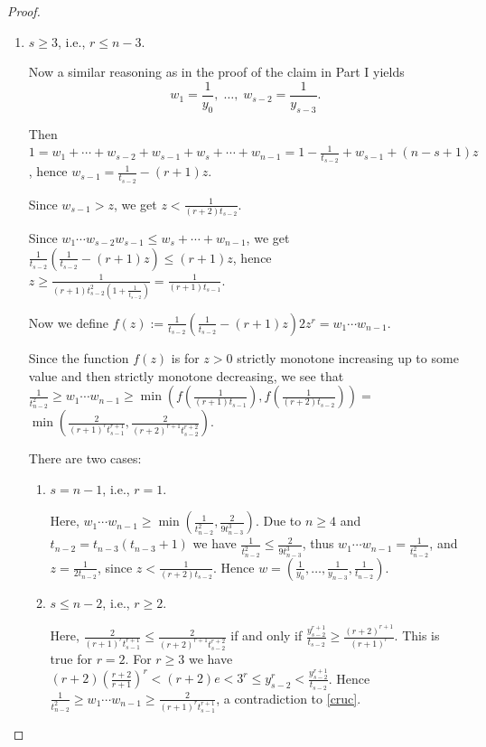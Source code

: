 \documentclass[a4paper,twoside]{article}
\begin{document}
\begin{proof}
\begin{enumerate}
\pagebreak
\item $s \geq 3$, i.e., $r \leq n-3$.

Now a similar reasoning as in the proof of the claim in Part I yields $$w_1 = \frac{1}{y_0},\; \ldots,\; w_{s-2} = \frac{1}{y_{s-3}}.$$ 

Then $1 = w_1 + \cdots + w_{s-2} + w_{s-1} + w_s + \cdots + w_{n-1} = 
1 - \frac{1}{t_{s-2}} + w_{s-1} + (n-s+1) z$, hence $w_{s-1} = \frac{1}{t_{s-2}} - (r+1) z$. 

Since $w_{s-1} > z$, we get $z < \frac{1}{(r+2) t_{s-2}}$.

Since $w_1 \cdots w_{s-2} w_{s-1} \leq w_s + \cdots + w_{n-1}$, we get 
$\frac{1}{t_{s-2}} (\frac{1}{t_{s-2}} - (r+1) z) \leq (r+1) z$, hence 
$z \geq \frac{1}{(r+1) t_{s-2}^2 (1 + \frac{1}{t_{s-2}})} = \frac{1}{(r+1) t_{s-1}}$.

Now we define $f(z) := \frac{1}{t_{s-2}} (\frac{1}{t_{s-2}} - (r+1) z) 2 z^r = w_1 \cdots w_{n-1}$. 

Since the function $f(z)$ is for $z > 0$ 
strictly monotone increasing up 
to some value and then strictly monotone decreasing, we see that\\
$\frac{1}{t_{n-2}^2} \geq w_1 \cdots w_{n-1} 
\geq \min(f(\frac{1}{(r+1) t_{s-1}}),f(\frac{1}{(r+2) t_{s-2}})) = $\\$\min(\frac{2}{(r+1)^r t_{s-1}^{r+1}}, 
\frac{2}{(r+2)^{r+1} t_{s-2}^{r+2}})$.

There are two cases:

\begin{enumerate}
\item $s = n-1$, i.e., $r=1$.

Here, 
$w_1 \cdots w_{n-1} \geq \min(\frac{1}{t_{n-2}^2}, \frac{2}{9 t_{n-3}^3})$. 
Due to $n \geq 4$ and $t_{n-2} = t_{n-3} (t_{n-3}+1)$ we have $\frac{1}{t_{n-2}^2} \leq \frac{2}{9 t_{n-3}^3}$, 
thus $w_1 \cdots w_{n-1} = \frac{1}{t_{n-2}^2}$, and 
$z = \frac{1}{2 t_{n-2}}$, since $z < \frac{1}{(r+2)t_{s-2}}$. Hence 
$w = (\frac{1}{y_0}, \ldots, \frac{1}{y_{n-3}}, \frac{1}{t_{n-2}})$.

\item $s \leq n-2$, i.e., $r \geq 2$.

Here, $\frac{2}{(r+1)^r t_{s-1}^{r+1}} \leq \frac{2}{(r+2)^{r+1} t_{s-2}^{r+2}}$ 
if and only if $\frac{y_{s-2}^{r+1}}{t_{s-2}} \geq \frac{(r+2)^{r+1}}{(r+1)^r}$. 
This is true for $r=2$. For $r \geq 3$ we have $(r+2)(\frac{r+2}{r+1})^r < (r+2) e < 3^r \leq 
y_{s-2}^r < \frac{y_{s-2}^{r+1}}{t_{s-2}}$. 
Hence $\frac{1}{t_{n-2}^2} \geq w_1 \cdots w_{n-1} \geq \frac{2}{(r+1)^r t_{s-1}^{r+1}}$, 
a contradiction to \ref{cruc}.


\end{enumerate}
\end{enumerate}
\end{proof}
\end{document}
